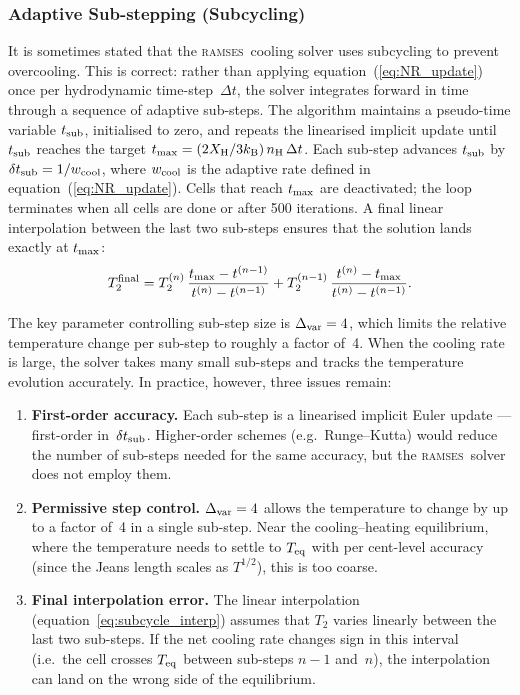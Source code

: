 \documentclass[fleqn,usenatbib]{mnras}
\newcommand{\ramses}{\textsc{ramses}}
\begin{document}
\subsubsection{Adaptive Sub-stepping (Subcycling)}
\label{sec:subcycling}

It is sometimes stated that the \ramses\ cooling solver uses subcycling
to prevent overcooling.  This is correct: rather than applying
equation~(\ref{eq:NR_update}) once per hydrodynamic time-step~$\Delta t$,
the solver integrates forward in time through a sequence of adaptive
sub-steps.  The algorithm maintains a pseudo-time variable
$t_{\rm sub}$, initialised to zero, and repeats the linearised implicit
update until $t_{\rm sub}$ reaches the target
$t_{\rm max} = (2X_{\rm H}/3k_{\rm B})\,n_{\rm H}\,\Delta t$.
Each sub-step advances $t_{\rm sub}$ by
$\delta t_{\rm sub} = 1/w_{\rm cool}$, where $w_{\rm cool}$ is the
adaptive rate defined in equation~(\ref{eq:NR_update}).  Cells that
reach $t_{\rm max}$ are deactivated; the loop terminates when all cells
are done or after 500 iterations.  A final linear interpolation between
the last two sub-steps ensures that the solution lands exactly at
$t_{\rm max}$:
\begin{equation}
  T_2^{\rm final} = T_2^{(n)}\,
  \frac{t_{\rm max} - t^{(n-1)}}{t^{(n)} - t^{(n-1)}}
  + T_2^{(n-1)}\,
  \frac{t^{(n)} - t_{\rm max}}{t^{(n)} - t^{(n-1)}}.
  \label{eq:subcycle_interp}
\end{equation}

The key parameter controlling sub-step size is
$\Delta_{\rm var} = 4$, which limits the relative temperature change per
sub-step to roughly a factor of~4.  When the cooling rate is large, the
solver takes many small sub-steps and tracks the temperature evolution
accurately.  In practice, however, three issues remain:

\begin{enumerate}
  \item \textbf{First-order accuracy.}  Each sub-step is a linearised
    implicit Euler update --- first-order in~$\delta t_{\rm sub}$.
    Higher-order schemes (e.g.\ Runge--Kutta) would reduce the number of
    sub-steps needed for the same accuracy, but the \ramses\ solver does
    not employ them.
  \item \textbf{Permissive step control.}  $\Delta_{\rm var} = 4$ allows
    the temperature to change by up to a factor of~4 in a single
    sub-step.  Near the cooling--heating equilibrium, where the
    temperature needs to settle to $T_{\rm eq}$ with per cent-level
    accuracy (since the Jeans length scales as $T^{1/2}$), this is too
    coarse.
  \item \textbf{Final interpolation error.}  The linear interpolation
    (equation~\ref{eq:subcycle_interp}) assumes that $T_2$ varies
    linearly between the last two sub-steps.  If the net cooling rate
    changes sign in this interval (i.e.\ the cell crosses $T_{\rm eq}$
    between sub-steps $n{-}1$ and~$n$), the interpolation can land on
    the wrong side of the equilibrium.
\end{enumerate}
\end{document}
